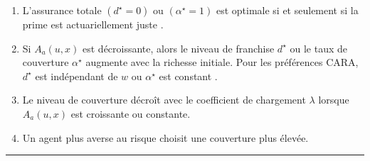 \begin{f}
\begin{enumerate}
	\item L'assurance totale \((d^\star = 0)\) ou  \((\alpha^\star = 1)\) est optimale si et seulement si la prime est actuariellement juste .
	
	\item Si \(A_a(u, x)\) est décroissante, alors le niveau de franchise \(d^\star\)  ou  le taux de couverture \(\alpha^\star\) augmente avec la richesse initiale.  
	Pour les préférences CARA, \(d^\star\) est indépendant de \(w\) ou \(\alpha^\star\) est constant .
	
	\item Le niveau de couverture  décroît avec le coefficient de chargement \(\lambda\) lorsque \(A_a(u, x)\) est croissante ou constante.
	
	\item Un agent plus averse au risque choisit  une couverture plus élevée.
\end{enumerate}
\end{f}

\hrule

